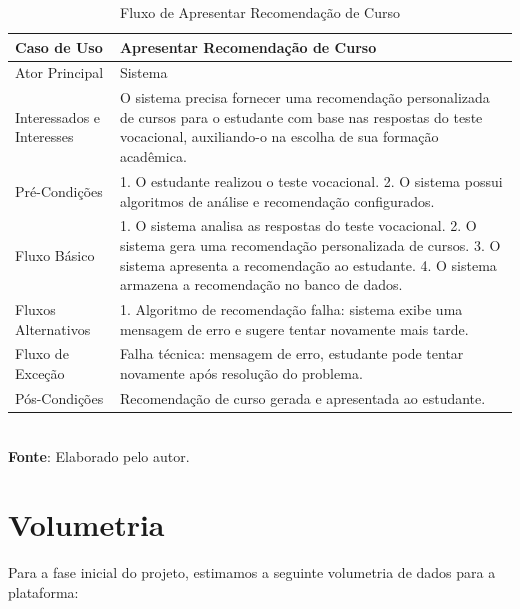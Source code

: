 \begin{table}[h!]
\centering
\caption{Fluxo de Apresentar Recomendação de Curso}
\begin{tabular}{|m{4cm}|m{11cm}|}
\hline
\textbf{Caso de Uso}   & \textbf{Apresentar Recomendação de Curso} \\
\hline
Ator Principal & Sistema\\
\hline
Interessados e Interesses & O sistema precisa fornecer uma recomendação personalizada de cursos para o estudante com base nas respostas do teste vocacional, auxiliando-o na escolha de sua formação acadêmica. \\
\hline
Pré-Condições & 

1. O estudante realizou o teste vocacional.
2. O sistema possui algoritmos de análise e recomendação configurados. \\
\hline
Fluxo Básico & 
1. O sistema analisa as respostas do teste vocacional.
2. O sistema gera uma recomendação personalizada de cursos.
3. O sistema apresenta a recomendação ao estudante.
4. O sistema armazena a recomendação no banco de dados.
\\
\hline
Fluxos Alternativos & 

1. Algoritmo de recomendação falha: sistema exibe uma mensagem de erro e sugere tentar novamente mais tarde.
\\
\hline
Fluxo de Exceção & Falha técnica: mensagem de erro, estudante pode tentar novamente após resolução do problema. \\
\hline
Pós-Condições & Recomendação de curso gerada e apresentada ao estudante.\\
\hline
\end{tabular}
\label{table:casos-de-uso}
\\[1ex]
\footnotesize \textbf{Fonte}: Elaborado pelo autor.
\end{table}

\section{Volumetria}

Para a fase inicial do projeto, estimamos a seguinte volumetria de dados para a plataforma:


